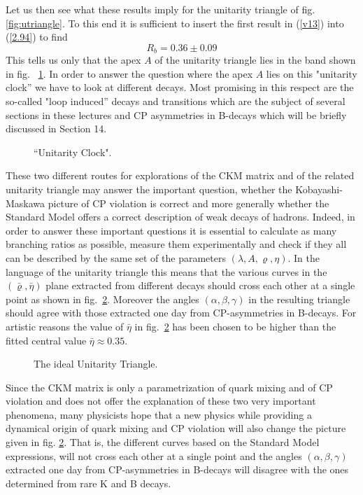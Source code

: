 \documentclass[12pt,rotate]{article}
\newcommand{\be}{\begin{equation}}
\newcommand{\ee}{\end{equation}}
\begin{document}
\begin{itemize}
Let us then see what these results imply for the unitarity triangle
of fig. \ref{fig:utriangle}. To this end it is sufficient to insert
the first result in (\ref{v13}) into (\ref{2.94}) to find
\be
 R_b=0.36\pm 0.09
\ee
This tells us only that the apex $A$ of the unitarity triangle lies
in the band shown in fig. \ \ref{L:2}. In order to answer the question where
the apex $A$ lies on this "unitarity clock'' we have to look at different
decays. Most promising in this respect are the so-called "loop induced''
decays and transitions which are the subject of several sections in these
lectures
and CP asymmetries in B-decays which will be briefly discussed in Section 14.
\begin{figure}[hbt]
\vspace{0.001in}
\centerline{
\epsfysize=4in
}
\vspace{0.005in}
\caption[]{``Unitarity Clock".
\label{L:2}}
\end{figure}
These two different routes for explorations of the CKM matrix
and of the related unitarity triangle may answer the important question, 
whether
the Kobayashi-Maskawa picture
of CP violation is correct and more generally whether the Standard
Model offers a correct description of weak decays of hadrons. Indeed,
in order
to answer these important questions it is essential to calculate as
many branching ratios as possible, measure them experimentally and
check if they all can be described by the same set of the parameters
$(\lambda,A,\varrho,\eta)$. In the language of the unitarity triangle
this means that the various curves in the $(\bar\varrho,\bar\eta)$ plane
extracted from different decays should cross each other at a single point
as shown in fig.~\ref{fig:2011}.
Moreover the angles $(\alpha,\beta,\gamma)$ in the
resulting triangle should agree with those extracted one day from
CP-asymmetries in B-decays. For artistic reasons the value of
$\bar\eta$ in fig.~\ref{fig:2011}
has been chosen to be higher than the fitted central value
$\bar\eta\approx 0.35.$
\begin{figure}[hbt]
\vspace{0.10in}
\centerline{
\epsfysize=4.3in
}
\vspace{0.08in}
\caption[]{
The ideal Unitarity Triangle. 
\label{fig:2011}}
\end{figure}

Since the CKM matrix is only a parametrization of quark mixing and 
of CP violation and does not offer the explanation of these two
very important phenomena, many physicists hope that a new physics
while providing a dynamical origin of quark mixing and CP violation will
also change the picture given in fig. \ref{fig:2011}. 
That is, the different curves
based on the Standard Model expressions, will not cross each other 
at a single point
and the angles $(\alpha,\beta,\gamma)$ 
extracted one day from
CP-asymmetries in B-decays will disagree with the ones determined from
rare K and B decays.


\end{itemize}
\end{document}
